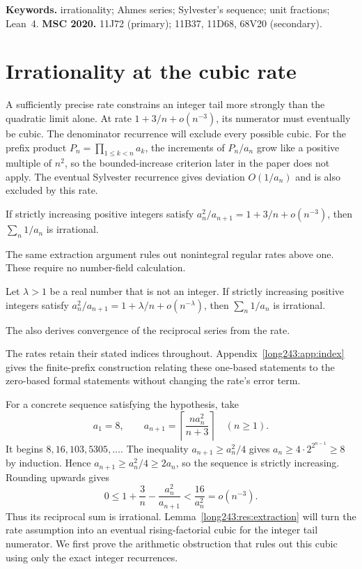 \documentclass[11pt]{article}
\begin{document}
\medskip
\noindent\textbf{Keywords.} irrationality; Ahmes series; Sylvester's sequence;
unit fractions; Lean~4.
\qquad
\textbf{MSC 2020.} 11J72 (primary); 11B37, 11D68, 68V20 (secondary).

\section{Irrationality at the cubic rate}\label{long243:sec:cubicrate}

A sufficiently precise rate constrains an integer tail more strongly
than the quadratic limit alone. At rate $1+3/n+o(n^{-3})$, its
numerator must eventually be cubic. The denominator recurrence will
exclude every possible cubic. For the prefix product
$P_n=\prod_{1\le k<n}a_k$, the increments of $P_n/a_n$ grow like a
positive multiple of $n^2$, so the bounded-increase criterion
later in the paper does not apply. The eventual Sylvester recurrence gives deviation
$O(1/a_n)$ and is also excluded by this rate.

\begin{theorem}\label{long243:res:cubicrate}
If strictly increasing positive integers satisfy
$a_n^2/a_{n+1}=1+3/n+o(n^{-3})$, then $\sum_n1/a_n$ is irrational.
\end{theorem}

The same extraction argument rules out nonintegral regular rates above
one. These require no number-field calculation.

\begin{theorem}\label{long243:res:nonintegralrate}
Let $\lambda>1$ be a real number that is not an integer. If strictly
increasing positive integers satisfy
$a_n^2/a_{n+1}=1+\lambda/n+o(n^{-\lambda})$, then
$\sum_n1/a_n$ is irrational.
\end{theorem}

The 
also derives convergence of the reciprocal series from the rate.


The rates retain their stated indices throughout. Appendix~\ref{long243:app:index}
gives the finite-prefix construction relating these one-based statements
to the zero-based formal statements without changing the rate's error term.

For a concrete sequence satisfying the hypothesis, take
\[
 a_1=8,\qquad a_{n+1}=\left\lceil\frac{n a_n^2}{n+3}\right\rceil
 \quad(n\ge1).
\]
It begins $8,16,103,5305,\ldots$. The inequality $a_{n+1}\ge a_n^2/4$
gives $a_n\ge4\cdot2^{2^{n-1}}\ge8$ by induction. Hence
$a_{n+1}\ge a_n^2/4\ge2a_n$, so the sequence is strictly increasing.
Rounding upwards gives
\[
 0\le1+\frac3n-\frac{a_n^2}{a_{n+1}}<\frac{16}{a_n^2}=o(n^{-3}).
\]
Thus its reciprocal sum is irrational. Lemma~\ref{long243:res:extraction}
will turn the rate assumption into an eventual rising-factorial cubic
for the integer tail numerator. We first prove the arithmetic obstruction
that rules out this cubic using only the exact integer recurrences.
\end{document}
